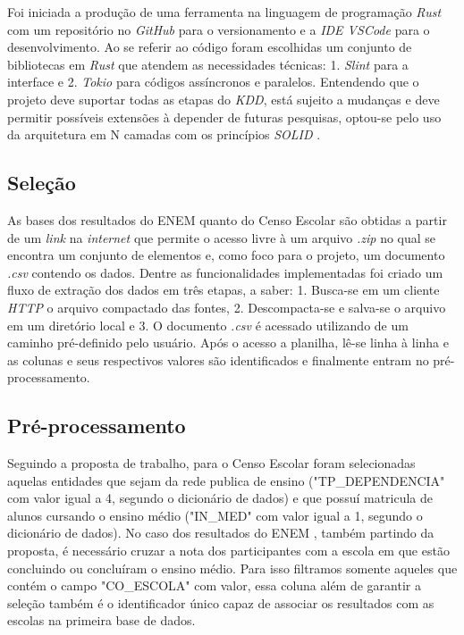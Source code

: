 \documentclass[12pt]{article}
\begin{document}
Foi iniciada a produção de uma ferramenta na linguagem de programação \textit{Rust} \cite{misc:rust_lang} com um repositório \cite{misc:proj_repo} no \textit{GitHub} \cite{misc:github_repo} para o versionamento e a \textit{IDE VSCode} \cite{misc:vscode_ide} para o desenvolvimento. Ao se referir ao código foram escolhidas um conjunto de bibliotecas em \textit{Rust} \cite{misc:rust_lang} que atendem as necessidades técnicas: 1. \textit{Slint} \cite{misc:slint_lib} para a interface e 2. \textit{Tokio} \cite{misc:tokio_lib} para códigos assíncronos e paralelos. Entendendo que o projeto deve suportar todas as etapas do \textit{KDD}, está sujeito a mudanças e deve permitir possíveis extensões à depender de futuras pesquisas, optou-se pelo uso da arquitetura em N camadas \cite{book:n_layers} com os princípios \textit{SOLID} \cite{misc:solid}.

\subsection{Seleção}

As bases dos resultados do ENEM quanto do Censo Escolar são obtidas a partir de um \textit{link} na \textit{internet} que permite o acesso livre à um arquivo \textit{.zip} no qual se encontra um conjunto de elementos e, como foco para o projeto, um documento \textit{.csv} contendo os dados. Dentre as funcionalidades implementadas foi criado um fluxo de extração dos dados em três etapas, a saber: 1. Busca-se em um cliente \textit{HTTP} o arquivo compactado das fontes, 2. Descompacta-se e salva-se o arquivo em um diretório local e 3. O documento \textit{.csv} é acessado utilizando de um caminho pré-definido pelo usuário. Após o acesso a planilha, lê-se linha à linha e as colunas e seus respectivos valores são identificados e finalmente entram no pré-processamento.

\subsection{Pré-processamento}

Seguindo a proposta de trabalho, para o Censo Escolar \cite{misc:micro_escolas} foram selecionadas aquelas entidades que sejam da rede publica de ensino ("TP\_DEPENDENCIA" com valor igual a 4, segundo o dicionário de dados) e que possuí matricula de alunos cursando o ensino médio ("IN\_MED" com valor igual a 1, segundo o dicionário de dados). No caso dos resultados do ENEM \cite{misc:micro_enem}, também partindo da proposta, é necessário cruzar a nota dos participantes com a escola em que estão concluindo ou concluíram o ensino médio. Para isso filtramos somente aqueles que contém o campo "CO\_ESCOLA" com valor, essa coluna além de garantir a seleção também é o identificador único capaz de associar os resultados com as escolas na primeira base de dados.
\end{document}
